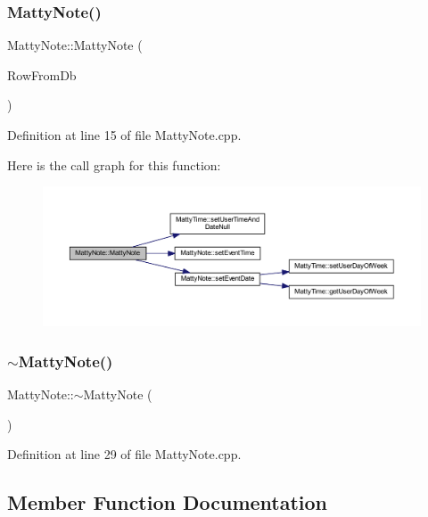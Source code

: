 \subsubsection{\texorpdfstring{Matty\+Note()}{MattyNote()}\hspace{0.1cm}{\footnotesize\ttfamily [2/2]}}
{\footnotesize\ttfamily Matty\+Note\+::\+Matty\+Note (\begin{DoxyParamCaption}\item[{Q\+String\+List}]{Row\+From\+Db }\end{DoxyParamCaption})}



Definition at line 15 of file Matty\+Note.\+cpp.

Here is the call graph for this function\+:
\nopagebreak
\begin{figure}[H]
\begin{center}
\leavevmode
\includegraphics[width=350pt]{classMattyNote_a101e9c2475ee2567dfa2e168b543806f_cgraph}
\end{center}
\end{figure}
\hypertarget{classMattyNote_a2831641523b4a0d5c36100689f95c912}{}\label{classMattyNote_a2831641523b4a0d5c36100689f95c912} 
\subsubsection{\texorpdfstring{$\sim$\+Matty\+Note()}{~MattyNote()}}
{\footnotesize\ttfamily Matty\+Note\+::$\sim$\+Matty\+Note (\begin{DoxyParamCaption}{ }\end{DoxyParamCaption})}



Definition at line 29 of file Matty\+Note.\+cpp.



\subsection{Member Function Documentation}
\hypertarget{classMattyNote_ade5ef053d6d9ba158d9842feadd39754}{}\label{classMattyNote_ade5ef053d6d9ba158d9842feadd39754} 
